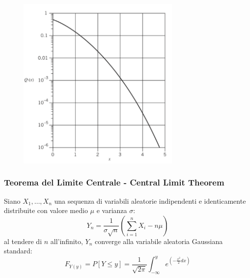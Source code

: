             \begin{figure}[H]
                \centering
                \includegraphics[width = 8cm]{media/grafo funzione q.png}
            \end{figure}
        \subsubsection{Teorema del Limite Centrale - Central Limit Theorem}\label{Teorema del Limite Centrale - Central Limit Theorem}
            Siano $X_1,\dots,X_n$ una sequenza di variabili aleatorie indipendenti e identicamente distribuite con valore medio $\mu$ e varianza $\sigma$:
            \[
                Y_n = \frac{1}{\sigma\sqrt{n}}\left(\sum_{i=1}^{n}X_i-n\mu\right)    
            \]
            al tendere di $n$ all'infinito, $Y_n$ converge alla variabile aleatoria Gaussiana standard:
            \[
                F_{Y(y)} =P[Y\leq y] = \frac{1}{\sqrt{2\pi}} \int_{-\infty}^{y}e^{\left(-\frac{x^2}{2}dx\right)}    
            \]
